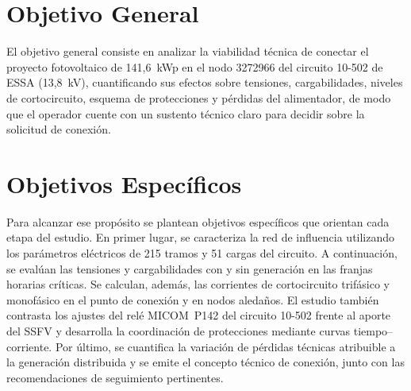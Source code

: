 \section{Objetivo General}

El objetivo general consiste en analizar la viabilidad técnica de conectar el proyecto fotovoltaico de 141,6~kWp en el nodo 3272966 del circuito 10-502 de ESSA (13,8~kV), cuantificando sus efectos sobre tensiones, cargabilidades, niveles de cortocircuito, esquema de protecciones y pérdidas del alimentador, de modo que el operador cuente con un sustento técnico claro para decidir sobre la solicitud de conexión.

\section{Objetivos Específicos}

Para alcanzar ese propósito se plantean objetivos específicos que orientan cada etapa del estudio. En primer lugar, se caracteriza la red de influencia utilizando los parámetros eléctricos de 215 tramos y 51 cargas del circuito. A continuación, se evalúan las tensiones y cargabilidades con y sin generación en las franjas horarias críticas. Se calculan, además, las corrientes de cortocircuito trifásico y monofásico en el punto de conexión y en nodos aledaños. El estudio también contrasta los ajustes del relé MICOM~P142 del circuito 10-502 frente al aporte del SSFV y desarrolla la coordinación de protecciones mediante curvas tiempo--corriente. Por último, se cuantifica la variación de pérdidas técnicas atribuible a la generación distribuida y se emite el concepto técnico de conexión, junto con las recomendaciones de seguimiento pertinentes.
